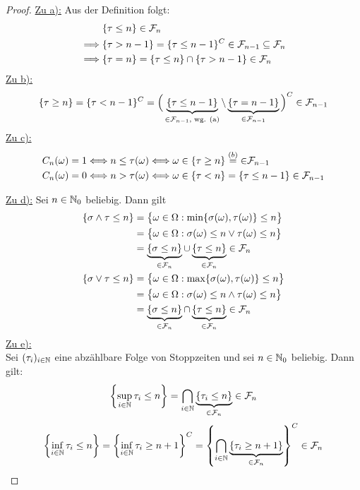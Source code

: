 \begin{proof}
	\underline{Zu a):} Aus der Definition folgt:
	\begin{align*}
		&\{\tau \leq n\} \in \mathcal{F}_n \\
		\implies & \{\tau > n-1\} = \{\tau \leq n-1\}^C \in \mathcal{F}_{n-1} \subseteq \mathcal{F}_n \\
		\implies & \{\tau = n\} = \{\tau \leq n\} \cap \{\tau > n-1\} \in \mathcal{F}_n
	\end{align*}
	\underline{Zu b):}
	\begin{align*}
		\{\tau \geq n \} =\lbrace\tau <n-1\rbrace^C= \Big(\underbrace{\{\tau \leq n-1 \}}_{\in\mathcal{F}_{n-1}\text{, wg. (a)}} \setminus \underbrace{\{\tau = n-1 \}}_{\in\mathcal{F}_{n-1}} \Big)^C \in \mathcal{F}_{n-1}
	\end{align*}
	\underline{Zu c):}
	\begin{align*}
		C_n(\omega)&=1\Longleftrightarrow n\leq\tau(\omega)\Longleftrightarrow
		\omega\in\lbrace\tau\geq n\rbrace\stackrel{(b)}{=}{\in}\mathcal{F}_{n-1}\\
		C_n(\omega)&=0\Longleftrightarrow
		n>\tau(\omega)\Longleftrightarrow
		\omega\in\lbrace\tau<n\rbrace=\lbrace\tau\leq n-1\rbrace\in\mathcal{F}_{n-1}
	\end{align*}

	\underline{Zu d):} Sei $n\in\mathbb{N}_0$ beliebig. Dann gilt
	\begin{align*}
		\{\sigma \wedge \tau \leq n \}
		&=\big\lbrace\omega\in\Omega:\min\lbrace\sigma(\omega),\tau(\omega)\rbrace\leq n\big\rbrace\\
		&=\big\lbrace\omega\in\Omega:\sigma(\omega)\leq n\vee\tau(\omega)\leq n\big\rbrace\\
		&=\underbrace{\{\sigma \leq n\}}_{\in \mathcal{F}_n} \cup \underbrace{\{\tau \leq n\}}_{\in\mathcal{F}_n} \in \mathcal{F}_n \\
		\{\sigma \vee \tau \leq n \}
		&=\big\lbrace\omega\in\Omega:\max\lbrace\sigma(\omega),\tau(\omega)\rbrace\leq n\big\rbrace\\
		&=\big\lbrace\omega\in\Omega:\sigma(\omega)\leq n\wedge\tau(\omega)\leq n\big\rbrace\\
		&=\underbrace{\{\sigma \leq n\}}_{\in \mathcal{F}_n} \cap \underbrace{\{\tau \leq n\}}_{\in\mathcal{F}_n} \in \mathcal{F}_n \\
	\end{align*}
	\underline{Zu e):}\\
	Sei $(\tau_i)_{i\in\mathbb{N}}$ eine abzählbare Folge von Stoppzeiten und sei $n\in\mathbb{N}_0$ beliebig. Dann gilt:
	\begin{align*}
		\left\lbrace\sup_{i\in\mathbb{N}} \tau_{i} \leq n\right\rbrace
		= \bigcap_{i\in\mathbb{N}}\underbrace{\{\tau_i \leq n\}}_{\in\mathcal{F}_n} \in \mathcal{F}_n
	\end{align*}
	\begin{align*}
		\left\lbrace\inf_{i\in\mathbb{N}} \tau_{i} \leq n\right\rbrace =
		\left\lbrace\inf_{i\in\mathbb{N}} \tau_{i} \geq n+1\right\rbrace^C = \left\lbrace\bigcap_{i\in\mathbb{N}}\underbrace{\{\tau_i \geq n+1\}}_{\in\mathcal{F}_n}\right\rbrace^C \in \mathcal{F}_n
	\end{align*}
\end{proof}

